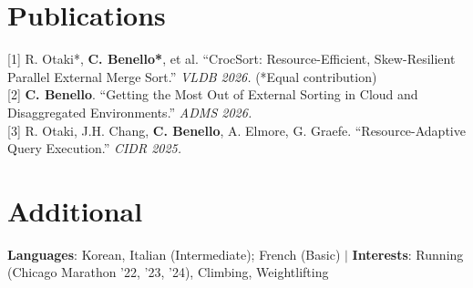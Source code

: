 \documentclass[letterpaper,10pt]{article}
\begin{document}
\section{Publications}
 \begin{itemize}[leftmargin=0.015in, label={}]
    \small{\item{
     {[1] R. Otaki*, \textbf{C. Benello*}, et al. ``CrocSort: Resource-Efficient, Skew-Resilient Parallel External Merge Sort.'' \textit{VLDB 2026.} (*Equal contribution)} \\
     {[2] \textbf{C. Benello}. ``Getting the Most Out of External Sorting in Cloud and Disaggregated Environments.'' \textit{ADMS 2026.}} \\
     {[3] R. Otaki, J.H. Chang, \textbf{C. Benello}, A. Elmore, G. Graefe. ``Resource-Adaptive Query Execution.'' \textit{CIDR 2025.}}
    }}
 \end{itemize}\vspace{-9pt}

\section{Additional}
 \begin{itemize}[leftmargin=0.015in, label={}]
    \small{\item{
     \textbf{Languages}{: Korean, Italian (Intermediate); French (Basic) $|$ \textbf{Interests}: Running (Chicago Marathon '22, '23, '24), Climbing, Weightlifting}
    }}
 \end{itemize}
\end{document}
